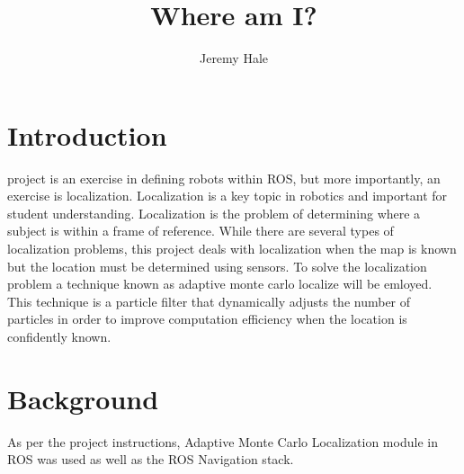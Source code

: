 \documentclass[10pt,journal,compsoc]{IEEEtran}
\begin{document}
\title{Where am I?}

\author{Jeremy Hale}

%
{}


\maketitle
\IEEEdisplaynontitleabstractindextext
\IEEEpeerreviewmaketitle
\section{Introduction}
\label{sec:introduction}

 project is an exercise in defining robots within ROS, but more importantly, an exercise is localization. Localization is a key topic in robotics and important for student understanding. Localization is the problem of determining where a subject is within a frame of reference. While there are several types of localization problems, this project deals with localization when the map is known but the location must be determined using sensors. To solve the localization problem a technique known as adaptive monte carlo localize will be emloyed. This technique is a particle filter that dynamically adjusts the number of particles in order to improve computation efficiency when the location is confidently known.

\section{Background}
As per the project instructions, Adaptive Monte Carlo Localization module in ROS was used as well as the ROS Navigation stack.
\end{document}
